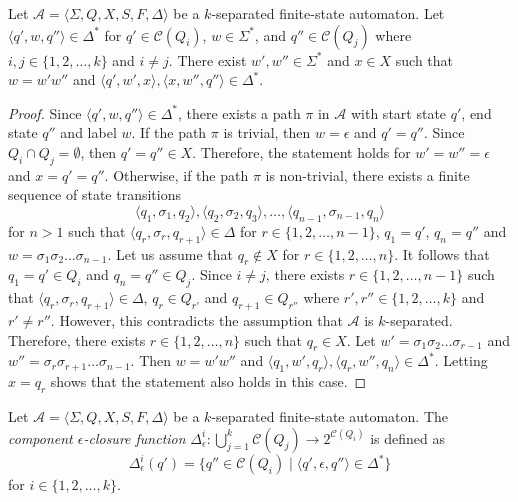 \begin{proposition}\label{prop:separator_path}
  Let $\mathcal{A} = \langle \Sigma, Q, X, S, F, \Delta \rangle$ be a $k$-separated
  finite-state automaton. Let $\langle q', w, q'' \rangle \in \Delta^*$ for $q' \in
  \mathcal{C}(Q_i)$, $w \in \Sigma^*$, and $q'' \in \mathcal{C}(Q_j)$ where $i, j \in
  \{ 1, 2, \ldots, k \}$ and $i \neq j$. There exist $w', w'' \in \Sigma^*$ and $x
  \in X$ such that $w = w'w''$ and $\langle q', w', x \rangle, \langle x, w'', q''
  \rangle \in \Delta^*$.
\end{proposition}

\begin{proof}
  Since $\langle q', w, q'' \rangle \in \Delta^*$, there exists a path $\pi$ in
  $\mathcal{A}$ with start state $q'$, end state $q''$ and label $w$. If the path
  $\pi$ is trivial, then $w = \epsilon$ and $q' = q''$. Since $Q_i \cap Q_j =
  \emptyset$, then $q' = q'' \in X$. Therefore, the statement holds for $w' = w'' =
  \epsilon$ and $x = q' = q''$. Otherwise, if the path $\pi$ is non-trivial, there
  exists a finite sequence of state transitions
  \begin{equation*}
    \langle q_1, \sigma_1, q_2 \rangle, \langle q_2, \sigma_2, q_3 \rangle, \ldots,
    \langle q_{n-1}, \sigma_{n-1}, q_n \rangle
  \end{equation*}
  for $n > 1$ such that $\langle q_r, \sigma_r, q_{r+1} \rangle \in \Delta$ for $r
  \in \{ 1, 2, \ldots, n-1 \}$, $q_1 = q'$, $q_n = q''$ and $w = \sigma_1 \sigma_2
  \ldots \sigma_{n-1}$. Let us assume that $q_r \not\in X$ for $r \in \{ 1, 2,
  \ldots, n \}$. It follows that $q_1 = q' \in Q_i$ and $q_n = q'' \in Q_j$. Since $i
  \neq j$, there exists $r \in \{ 1, 2, \ldots, n-1 \}$ such that $\langle q_r,
  \sigma_r, q_{r+1} \rangle \in \Delta$, $q_r \in Q_{r'}$ and $q_{r+1} \in Q_{r''}$
  where $r', r'' \in \{ 1, 2, \ldots, k \}$ and $r' \neq r''$. However, this
  contradicts the assumption that $\mathcal{A}$ is $k$-separated. Therefore, there
  exists $r \in \{ 1, 2, \ldots, n \}$ such that $q_r \in X$. Let $w' = \sigma_1
  \sigma_2 \ldots \sigma_{r-1}$ and $w'' = \sigma_r \sigma_{r+1} \ldots
  \sigma_{n-1}$. Then $w = w'w''$ and $\langle q_1, w', q_r \rangle, \langle q_r,
  w'', q_n \rangle \in \Delta^*$. Letting $x = q_r$ shows that the statement also
  holds in this case.
\end{proof}

\begin{definition}
  Let $\mathcal{A} = \langle \Sigma, Q, X, S, F, \Delta \rangle$ be a $k$-separated
  finite-state automaton. The \emph{component $\epsilon$-closure function}
  $\Delta_\epsilon^i : \bigcup_{j=1}^k \mathcal{C}(Q_j) \rightarrow
  2^{\mathcal{C}(Q_i)}$ is defined as
  \begin{equation*}
    \Delta_\epsilon^i(q') = \{ q'' \in \mathcal{C}(Q_i) \mid \langle q', \epsilon,
    q'' \rangle \in \Delta^* \}
  \end{equation*}
  for $i \in \{ 1, 2, \ldots, k \}$.
\end{definition}

